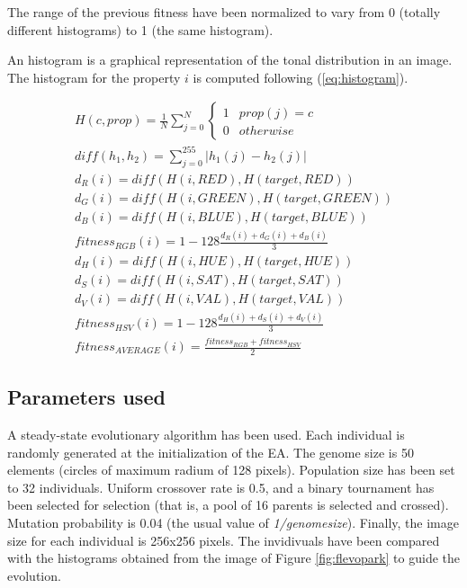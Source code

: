 \documentclass[conference]{IEEEtran}
\begin{document}
The range of the previous fitness have been normalized to vary from 0 (totally different histograms) to 1 (the same histogram).

An histogram is a graphical representation of the tonal distribution in an image. The histogram for the property $i$ is computed following (\ref{eq:histogram}).


\begin{eqnarray}
	\label{eq:fitness}
	H(c, prop) = \frac{1}{N}\sum_{j=0}^N \left\{\begin{matrix}
1 & prop(j) = c\\ 
0 & otherwise
\end{matrix}\right. \\
	diff(h_1, h_2) = \sum_{j=0}^{255} |h_1(j) - h_2(j)| \\
	d_R(i) = diff(H(i, RED), H(target, RED))\\
	d_G(i) = diff(H(i, GREEN), H(target, GREEN))\\
	d_B(i) =  diff(H(i, BLUE), H(target, BLUE))\\
	fitness_{RGB}(i) = 1 - 128\frac{d_R(i) + d_G(i) + d_B(i)}{3} \\
	d_H(i) = diff(H(i, HUE), H(target, HUE))\\
	d_S(i) = diff(H(i, SAT), H(target, SAT))\\
	d_V(i) =  diff(H(i, VAL), H(target, VAL))\\
	fitness_{HSV}(i) = 1 - 128\frac{d_H(i) + d_S(i) + d_V(i)}{3}\\	
	fitness_{AVERAGE}(i) = \frac{fitness_{RGB}+fitness_{HSV}}{2}
\end{eqnarray}





\subsection{Parameters used}

A steady-state evolutionary algorithm has been used. Each individual is randomly generated at the initialization of the EA. The genome size is 50 elements (circles of maximum radium of 128 pixels). Population size has been set to 32 individuals. Uniform crossover rate is 0.5, and a binary tournament has been selected for selection (that is, a pool of 16 parents is selected and crossed). Mutation probability is 0.04 (the usual value of {\em 1/genomesize}). Finally, the image size for each individual is 256x256 pixels. The invidivuals have been compared with the histograms obtained from the image of Figure \ref{fig:flevopark} to guide the evolution.
\end{document}
